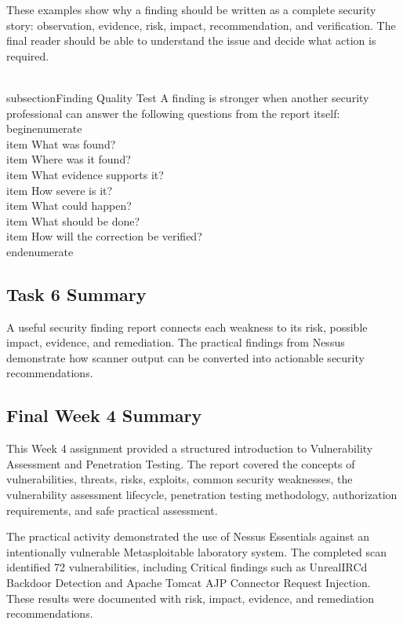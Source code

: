 \documentclass[11pt,a4paper]{article}
\begin{document}
These examples show why a finding should be written as a complete security story: observation, evidence, risk, impact, recommendation, and verification. The final reader should be able to understand the issue and decide what action is required.

\\subsection{Finding Quality Test}
A finding is stronger when another security professional can answer the following questions from the report itself:
\\begin{enumerate}
\\item What was found?
\\item Where was it found?
\\item What evidence supports it?
\\item How severe is it?
\\item What could happen?
\\item What should be done?
\\item How will the correction be verified?
\\end{enumerate}

\subsection{Task 6 Summary}
A useful security finding report connects each weakness to its risk, possible impact, evidence, and remediation. The practical findings from Nessus demonstrate how scanner output can be converted into actionable security recommendations.

\subsection{Final Week 4 Summary}
This Week 4 assignment provided a structured introduction to Vulnerability Assessment and Penetration Testing. The report covered the concepts of vulnerabilities, threats, risks, exploits, common security weaknesses, the vulnerability assessment lifecycle, penetration testing methodology, authorization requirements, and safe practical assessment.

The practical activity demonstrated the use of Nessus Essentials against an intentionally vulnerable Metasploitable laboratory system. The completed scan identified 72 vulnerabilities, including Critical findings such as UnrealIRCd Backdoor Detection and Apache Tomcat AJP Connector Request Injection. These results were documented with risk, impact, evidence, and remediation recommendations.
\end{document}
